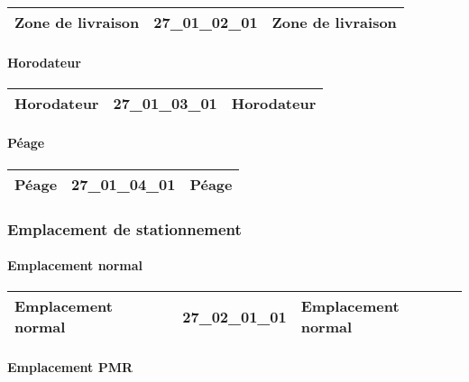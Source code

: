 \documentclass[12pt,titlepage,oneside]{book}
\begin{document}
\renewcommand{\arraystretch}{1.2}
\begin{supertabular}{|p{10cm}|c|p{15cm}|}
 Zone de livraison & 27\_01\_02\_01 & Zone de livraison\\
\hline
\end{supertabular}


\paragraph{Horodateur}
\noindent
\vspace{\baselineskip}

\renewcommand{\arraystretch}{1.2}
\begin{supertabular}{|p{10cm}|c|p{15cm}|}
 Horodateur & 27\_01\_03\_01 & Horodateur\\
\hline
\end{supertabular}


\paragraph{Péage}
\noindent
\vspace{\baselineskip}

\renewcommand{\arraystretch}{1.2}
\begin{supertabular}{|p{10cm}|c|p{15cm}|}
 Péage & 27\_01\_04\_01 & Péage\\
\hline
\end{supertabular}

\subsubsection{\large Emplacement de stationnement}
\paragraph{Emplacement normal}
\noindent
\vspace{\baselineskip}

\renewcommand{\arraystretch}{1.2}
\begin{supertabular}{|p{10cm}|c|p{15cm}|}
 Emplacement normal & 27\_02\_01\_01 & Emplacement normal\\
\hline
\end{supertabular}


\paragraph{Emplacement PMR}
\noindent
\vspace{\baselineskip}
\end{document}
